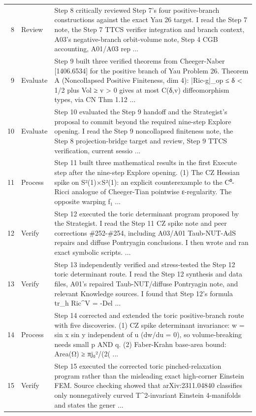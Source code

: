 \documentclass[UTF8,fontset=fandol,zihao=-4]{ctexart}
\begin{document}
\begin{longtable}{r p{} >{\raggedright\arraybackslash}p{}}
8 & Review & Step 8 critically reviewed Step 7's four positive-branch constructions against the exact Yau 26 target. I read the Step 7 note, the Step 7 TTCS verifier integration and branch context, A03's negative-branch orbit-volume note, Step 4 CGB accounting, A01/A03 rep ...\\
9 & Evaluate & Step 9 built three verified theorems from Cheeger-Naber [1406.6534] for the positive branch of Yau Problem 26. Theorem A (Noncollapsed Positive Finiteness, dim 4): |Ric-g|\_op ≤ δ < 1/2 plus Vol ≥ v > 0 gives at most C(δ,v) diffeomorphism types, via CN Thm 1.12 ...\\
10 & Evaluate & Step 10 evaluated the Step 9 handoff and the Strategist's proposal to commit beyond the required nine-step Explore opening. I read the Step 9 noncollapsed finiteness note, the Step 8 projection-bridge target and review, Step 9 TTCS verification, current sessio ...\\
11 & Process & Step 11 built three mathematical results in the first Execute step after the nine-step Explore opening. (1) The CZ Hessian spike on S²(1)×S²(1): an explicit counterexample to the C⁰-Ricci analogue of Cheeger-Tian pointwise ε-regularity. The opposite warping f₁ ...\\
12 & Verify & Step 12 executed the toric determinant program proposed by the Strategist. I read the Step 11 CZ spike note and peer corrections \#252-\#254, including A03/A01 Taub-NUT-AdS repairs and diffuse Pontryagin conclusions. I then wrote and ran exact symbolic scripts.  ...\\
13 & Verify & Step 13 independently verified and stress-tested the Step 12 toric determinant route. I read the Step 12 synthesis and data files, A01's repaired Taub-NUT/diffuse Pontryagin note, and relevant Knowledge sources. I found that Step 12's formula tr\_h Ric\textasciicircum{}V = -Del ...\\
14 & Process & Step 14 corrected and extended the toric positive-branch route with five discoveries. (1) CZ spike determinant invariance: w = sin x sin y independent of u (dw/du = 0), so volume-breaking needs small p AND q. (2) Faber-Krahn base-area bound: Area(Ω) ≥ πj₀²/(2( ...\\
15 & Verify & Step 15 executed the corrected toric pinched-relaxation program rather than the misleading exact high-corner Einstein FEM. Source checking showed that arXiv:2311.04840 classifies only nonnegatively curved T\textasciicircum{}2-invariant Einstein 4-manifolds and states the gener ...\\

\end{longtable}
\end{document}
